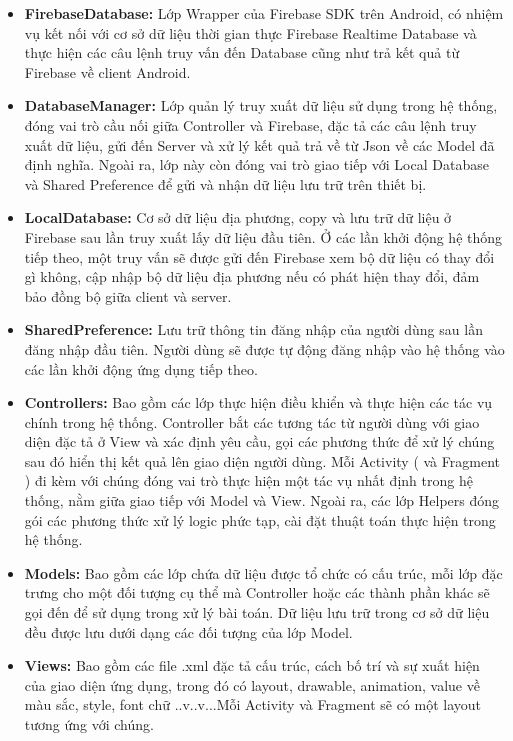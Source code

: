 \begin{itemize}
	\item \textbf{FirebaseDatabase: }Lớp Wrapper của Firebase SDK trên Android, có nhiệm vụ kết nối với cơ sở dữ liệu thời gian thực Firebase Realtime Database và thực hiện các câu lệnh truy vấn đến Database cũng như trả kết quả từ Firebase về client Android.
	\item \textbf{DatabaseManager: }Lớp quản lý truy xuất dữ liệu sử dụng trong hệ thống, đóng vai trò cầu nối giữa Controller và Firebase, đặc tả các câu lệnh truy xuất dữ liệu, gửi đến Server và xử lý kết quả trả về từ Json về các Model đã định nghĩa. Ngoài ra, lớp này còn đóng vai trò giao tiếp với Local Database và Shared Preference để gửi và nhận dữ liệu lưu trữ trên thiết bị. 
	\item \textbf{LocalDatabase: } Cơ sở dữ liệu địa phương, copy và lưu trữ dữ liệu ở Firebase sau lần truy xuất lấy dữ liệu đầu tiên. Ở các lần khởi động hệ thống tiếp theo, một truy vấn sẽ được gửi đến Firebase xem bộ dữ liệu có thay đổi gì không, cập nhập bộ dữ liệu địa phương nếu có phát hiện thay đổi, đảm bảo đồng bộ giữa client và server.
	\item \textbf{SharedPreference: } Lưu trữ thông tin đăng nhập của người dùng sau lần đăng nhập đầu tiên. Người dùng sẽ được tự động đăng nhập vào hệ thống vào các lần khởi động ứng dụng tiếp theo.
	\item \textbf{Controllers: } Bao gồm các lớp thực hiện điều khiển và thực hiện các tác vụ chính trong hệ thống. Controller bắt các tương tác từ người dùng với giao diện đặc tả ở View và xác định yêu cầu, gọi các phương thức để xử lý chúng sau đó hiển thị kết quả lên giao diện người dùng. Mỗi Activity ( và Fragment ) đi kèm với chúng đóng vai trò thực hiện một tác vụ nhất định trong hệ thống, nằm giữa giao tiếp với Model và View. Ngoài ra, các lớp Helpers đóng gói các phương thức xử lý logic phức tạp, cài đặt thuật toán thực hiện trong hệ thống.   	
	\item \textbf{Models: } Bao gồm các lớp chứa dữ liệu được tổ chức có cấu trúc, mỗi lớp đặc trưng cho một đối tượng cụ thể mà Controller hoặc các thành phần khác sẽ gọi đến để sử dụng trong xử lý bài toán. Dữ liệu lưu trữ trong cơ sở dữ liệu đều được lưu dưới dạng các đối tượng của lớp Model.
	\item \textbf{Views: } Bao gồm các file .xml đặc tả cấu trúc, cách bố trí và sự xuất hiện của giao diện ứng dụng, trong đó có layout, drawable, animation, value về màu sắc, style, font chữ ..v..v...Mỗi Activity và Fragment sẽ có một layout tương ứng với chúng.	 
\end{itemize}

